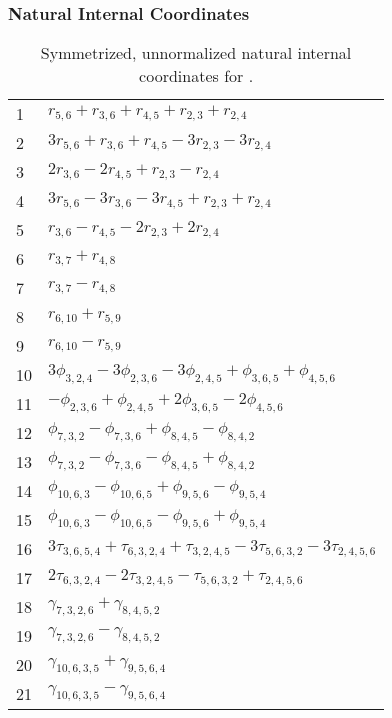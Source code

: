 \documentclass[10pt,oneside]{article}
\begin{document}
\subsubsection*{Natural Internal Coordinates}
\begin{table}[h!]
\centering
\caption{Symmetrized, unnormalized natural internal coordinates for .}
\small
\begin{tabular}{ll}
  1   & $r_{5,6} + r_{3,6} + r_{4,5} + r_{2,3} + r_{2,4}$ \\
  2   & $3r_{5,6} + r_{3,6} + r_{4,5} - 3r_{2,3} - 3r_{2,4}$ \\
  3   & $2r_{3,6} - 2r_{4,5} + r_{2,3} - r_{2,4}$ \\
  4   & $3r_{5,6} - 3r_{3,6} - 3r_{4,5} + r_{2,3} + r_{2,4}$ \\
  5   & $r_{3,6} - r_{4,5} - 2r_{2,3} + 2r_{2,4}$ \\
  6   & $r_{3,7} + r_{4,8}$ \\
  7   & $r_{3,7} - r_{4,8}$ \\
  8   & $r_{6,10} + r_{5,9}$ \\
  9   & $r_{6,10} - r_{5,9}$ \\
  10  & $3\phi_{3,2,4} - 3\phi_{2,3,6} - 3\phi_{2,4,5} + \phi_{3,6,5} + \phi_{4,5,6}$ \\
  11  & $-\phi_{2,3,6} + \phi_{2,4,5} + 2\phi_{3,6,5} - 2\phi_{4,5,6}$ \\
  12  & $\phi_{7,3,2} - \phi_{7,3,6} + \phi_{8,4,5} - \phi_{8,4,2}$ \\
  13  & $\phi_{7,3,2} - \phi_{7,3,6} - \phi_{8,4,5} + \phi_{8,4,2}$ \\
  14  & $\phi_{10,6,3} - \phi_{10,6,5} + \phi_{9,5,6} - \phi_{9,5,4}$ \\
  15  & $\phi_{10,6,3} - \phi_{10,6,5} - \phi_{9,5,6} + \phi_{9,5,4}$ \\
  16  & $3\tau_{3,6,5,4} + \tau_{6,3,2,4} + \tau_{3,2,4,5} - 3\tau_{5,6,3,2} - 3\tau_{2,4,5,6}$ \\
  17  & $2\tau_{6,3,2,4} - 2\tau_{3,2,4,5} - \tau_{5,6,3,2} + \tau_{2,4,5,6}$ \\
  18  & $\gamma_{7,3,2,6} + \gamma_{8,4,5,2}$ \\
  19  & $\gamma_{7,3,2,6} - \gamma_{8,4,5,2}$ \\
  20  & $\gamma_{10,6,3,5} + \gamma_{9,5,6,4}$ \\
  21  & $\gamma_{10,6,3,5} - \gamma_{9,5,6,4}$ \\
\end{tabular}
\end{table}
\end{document}
